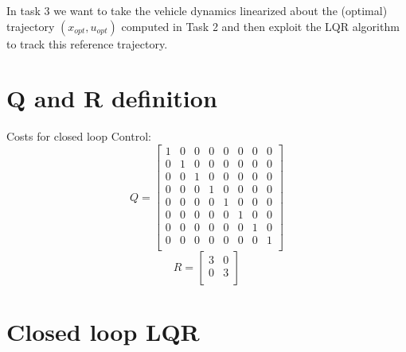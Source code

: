 In task 3 we want to take the vehicle dynamics linearized about the (optimal) trajectory $(x_{opt}, u_{opt})$ computed in
Task 2 and then exploit the LQR algorithm to track this reference trajectory.

\section{Q and R definition}
Costs for closed loop Control:
\[
Q = \begin{bmatrix}
1 & 0 & 0 & 0 & 0 & 0 & 0 & 0 \\
0 & 1 & 0 & 0 & 0 & 0 & 0 & 0 \\
0 & 0 & 1 & 0 & 0 & 0 & 0 & 0 \\
0 & 0 & 0 & 1 & 0 & 0 & 0 & 0 \\
0 & 0 & 0 & 0 & 1 & 0 & 0 & 0 \\
0 & 0 & 0 & 0 & 0 & 1 & 0 & 0 \\
0 & 0 & 0 & 0 & 0 & 0 & 1 & 0 \\
0 & 0 & 0 & 0 & 0 & 0 & 0 & 1 \\
\end{bmatrix}
\]
\[
R = \begin{bmatrix}
3 & 0 \\
0 & 3 \\
\end{bmatrix}
\]

\section{Closed loop LQR}

